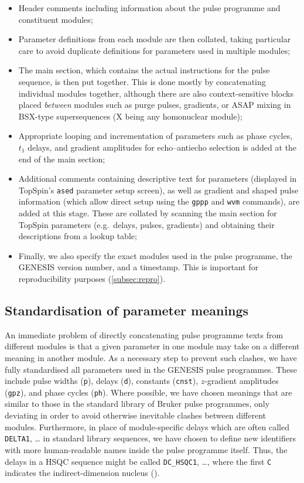 \documentclass[a4paper,11pt]{article}
\newcommand{\carbon}{\ch{^{13}C}}
\begin{document}
\begin{refsection}
\begin{itemize}
    \item Header comments including information about the pulse programme and constituent modules;
    \item Parameter definitions from each module are then collated, taking particular care to avoid duplicate definitions for parameters used in multiple modules;
    \item The main section, which contains the actual instructions for the pulse sequence, is then put together.
        This is done mostly by concatenating individual modules together, although there are also context-sensitive blocks placed \textit{between} modules such as purge pulses, gradients, or ASAP mixing\autocite{Claridge2019MRC} in BSX-type supersequences (X being any homonuclear module);
    \item Appropriate looping and incrementation of parameters such as phase cycles, \(t_1\) delays, and gradient amplitudes for echo--antiecho selection is added at the end of the main section;
    \item Additional comments containing descriptive text for parameters (displayed in TopSpin's \texttt{ased} parameter setup screen), as well as gradient and shaped pulse information (which allow direct setup using the \texttt{gppp} and \texttt{wvm} commands), are added at this stage.
        These are collated by scanning the main section for TopSpin parameters (e.g.\ delays, pulses, gradients) and obtaining their descriptions from a lookup table;
    \item Finally, we also specify the exact modules used in the pulse programme, the GENESIS version number, and a timestamp. This is important for reproducibility purposes (\cref{subsec:repro}).
\end{itemize}


\subsection{Standardisation of parameter meanings}

An immediate problem of directly concatenating pulse programme texts from different modules is that a given parameter in one module may take on a different meaning in another module.
As a necessary step to prevent such clashes, we have fully standardised all parameters used in the GENESIS pulse programmes.
These include pulse widths (\texttt{p}), delays (\texttt{d}), constants (\texttt{cnst}), \(z\)-gradient amplitudes (\texttt{gpz}), and phase cycles (\texttt{ph}).
Where possible, we have chosen meanings that are similar to those in the standard library of Bruker pulse programmes, only deviating in order to avoid otherwise inevitable clashes between different modules.
Furthermore, in place of module-specific delays which are often called \texttt{DELTA1}, \ldots{} in standard library sequences, we have chosen to define new identifiers with more human-readable names inside the pulse programme itself.
Thus, the delays in a HSQC sequence might be called \texttt{DC\_HSQC1}, \ldots{}, where the first \texttt{C} indicates the indirect-dimension nucleus (\carbon{}).


\end{refsection}
\end{document}
